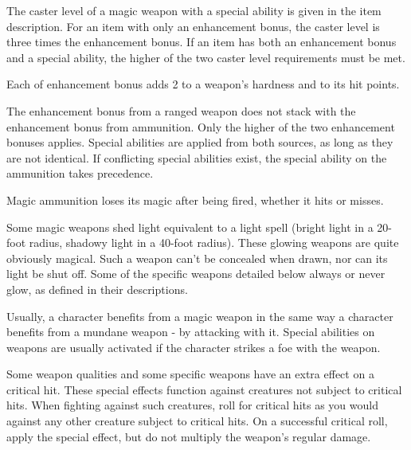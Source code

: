  The caster level of a magic weapon with a special ability is given in the item description. For an item with only an enhancement bonus, the caster level is three times the enhancement bonus. If an item has both an enhancement bonus and a special ability, the higher of the two caster level requirements must be met.

 Each  of enhancement bonus adds 2 to a weapon's hardness and  to its hit points.

 The enhancement bonus from a ranged weapon does not stack with the enhancement bonus from ammunition. Only the higher of the two enhancement bonuses applies. Special abilities are applied from both sources, as long as they are not identical. If conflicting special abilities exist, the special ability on the ammunition takes precedence.

Magic ammunition loses its magic after being fired, whether it hits or misses.

 Some magic weapons shed light equivalent to a light spell (bright light in a 20-foot radius, shadowy light in a 40-foot radius). These glowing weapons are quite obviously magical. Such a weapon can't be concealed when drawn, nor can its light be shut off. Some of the specific weapons detailed below always or never glow, as defined in their descriptions.

 Usually, a character benefits from a magic weapon in the same way a character benefits from a mundane weapon - by attacking with it. Special abilities on weapons are usually activated if the character strikes a foe with the weapon.

 Some weapon qualities and some specific weapons have an extra effect on a critical hit. These special effects function against creatures not subject to critical hits. When fighting against such creatures, roll for critical hits as you would against any other creature subject to critical hits. On a successful critical roll, apply the special effect, but do not multiply the weapon's regular damage.

